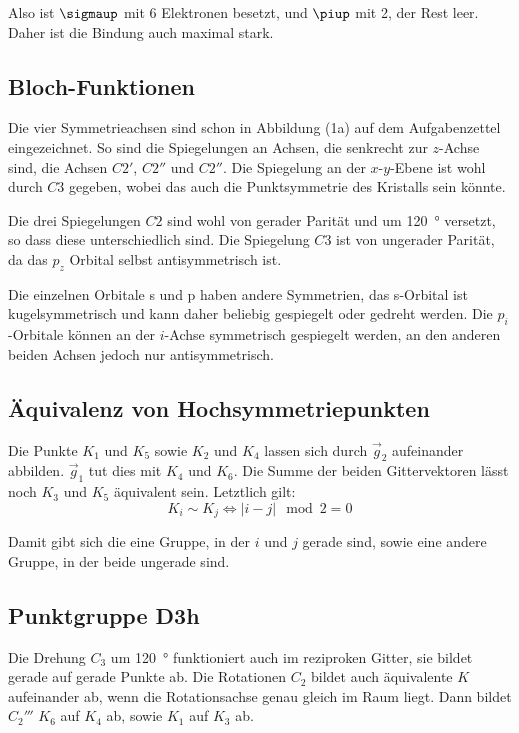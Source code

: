 Also ist $\sigmaup$ mit 6 Elektronen besetzt, und $\piup$ mit 2, der Rest leer.
Daher ist die Bindung auch maximal stark.

\subsection{Bloch-Funktionen}

Die vier Symmetrieachsen sind schon in Abbildung (1a) auf dem Aufgabenzettel
eingezeichnet. So sind die Spiegelungen an Achsen, die senkrecht zur $z$-Achse
sind, die Achsen $C2'$, $C2''$ und $C2''$. Die Spiegelung an der $x$-$y$-Ebene
ist wohl durch $C3$ gegeben, wobei das auch die Punktsymmetrie des Kristalls
sein könnte.

Die drei Spiegelungen $C2$ sind wohl von gerader Parität und um
\SI{120}{\degree} versetzt, so dass diese unterschiedlich sind. Die Spiegelung
$C3$ ist von ungerader Parität, da das $p_z$ Orbital selbst antisymmetrisch
ist.

Die einzelnen Orbitale s und p haben andere Symmetrien, das s-Orbital ist
kugelsymmetrisch und kann daher beliebig gespiegelt oder gedreht werden. Die
$p_i$-Orbitale können an der $i$-Achse symmetrisch gespiegelt werden, an den
anderen beiden Achsen jedoch nur antisymmetrisch.

\fehlt

\subsection{Äquivalenz von Hochsymmetriepunkten}

Die Punkte $K_1$ und $K_5$ sowie $K_2$ und $K_4$ lassen sich durch $\vec g_2$
aufeinander abbilden. $\vec g_1$ tut dies mit $K_4$ und $K_6$. Die Summe der
beiden Gittervektoren lässt noch $K_3$ und $K_5$ äquivalent sein. Letztlich
gilt:
\[
	K_i \sim K_j
	\iff
	|i - j| \mod 2 = 0
\]

Damit gibt sich die eine Gruppe, in der $i$ und $j$ gerade sind, sowie eine
andere Gruppe, in der beide ungerade sind.

\subsection{Punktgruppe D3h}

Die Drehung $C_3$ um \SI{120}{\degree} funktioniert auch im reziproken Gitter,
sie bildet gerade auf gerade Punkte ab. Die Rotationen $C_2$ bildet auch
äquivalente $K$ aufeinander ab, wenn die Rotationsachse genau gleich im Raum
liegt. Dann bildet $C_2'''$ $K_6$ auf $K_4$ ab, sowie $K_1$ auf $K_3$ ab.

